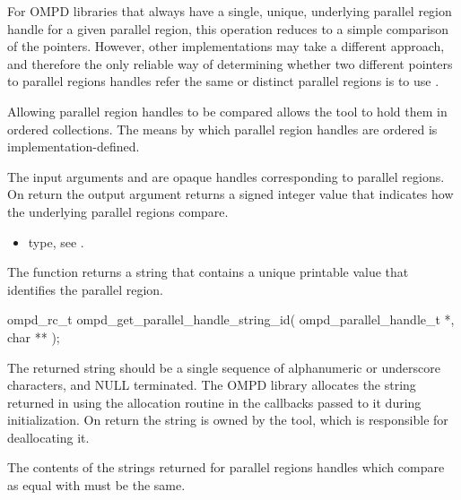 For OMPD libraries that always have a single, unique, underlying parallel region handle for 
a given parallel region, this operation reduces to a simple comparison of the pointers. However, 
other implementations may take a different approach, and therefore the only reliable way of 
determining whether two different pointers to parallel regions handles refer the same or distinct
parallel regions is to use .

Allowing parallel region handles to be compared allows the tool to hold them in ordered 
collections. The means by which parallel region handles are ordered is implementation-defined.

\argdesc

The input arguments  and  are opaque handles 
corresponding to parallel regions.
On return the output argument   returns a signed 
integer value that indicates how the underlying parallel regions compare.

\crossreferences
\begin{itemize}
	\item {} type, see .
\end{itemize}

\label{ompd:ompd_get_parallel_handle_string_id}
\summary
The  function returns a string that contains a unique 
printable value that identifies the parallel region.

\format

\begin{cspecific}
\begin{ompSyntax}
ompd_rc_t ompd_get_parallel_handle_string_id(
  ompd_parallel_handle_t *,
  char **
);
\end{ompSyntax}
\end{cspecific}


\descr
The returned string should be a single sequence of alphanumeric or underscore characters, and 
NULL terminated. The OMPD library allocates the string returned in 
using the allocation routine in the callbacks passed to it during initialization. On return the string is 
owned by the tool, which is responsible for deallocating it.

The contents of the strings returned for parallel regions handles which compare as equal with
 must be the same.


